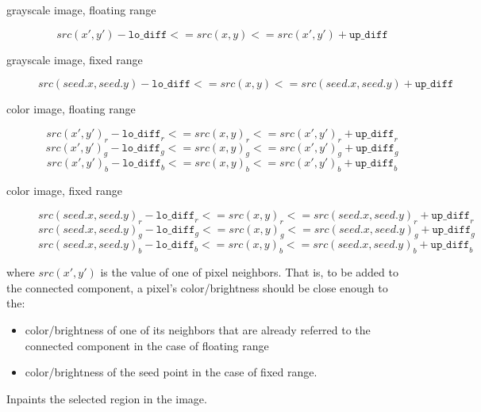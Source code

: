 \begin{description}

\item[grayscale image, floating range] \[
src(x',y')-\texttt{lo\_diff} <= src(x,y) <= src(x',y')+\texttt{up\_diff} \]

\item[grayscale image, fixed range] \[
src(seed.x,seed.y)-\texttt{lo\_diff}<=src(x,y)<=src(seed.x,seed.y)+\texttt{up\_diff} \]

\item[color image, floating range]
\[ src(x',y')_r-\texttt{lo\_diff}_r<=src(x,y)_r<=src(x',y')_r+\texttt{up\_diff}_r \]
\[ src(x',y')_g-\texttt{lo\_diff}_g<=src(x,y)_g<=src(x',y')_g+\texttt{up\_diff}_g \]
\[ src(x',y')_b-\texttt{lo\_diff}_b<=src(x,y)_b<=src(x',y')_b+\texttt{up\_diff}_b \]

\item[color image, fixed range]
\[ src(seed.x,seed.y)_r-\texttt{lo\_diff}_r<=src(x,y)_r<=src(seed.x,seed.y)_r+\texttt{up\_diff}_r \]
\[ src(seed.x,seed.y)_g-\texttt{lo\_diff}_g<=src(x,y)_g<=src(seed.x,seed.y)_g+\texttt{up\_diff}_g \]
\[ src(seed.x,seed.y)_b-\texttt{lo\_diff}_b<=src(x,y)_b<=src(seed.x,seed.y)_b+\texttt{up\_diff}_b \]
\end{description}

where $src(x',y')$ is the value of one of pixel neighbors. That is, to be added to the connected component, a pixel's color/brightness should be close enough to the:
\begin{itemize}
  \item color/brightness of one of its neighbors that are already referred to the connected component in the case of floating range
  \item color/brightness of the seed point in the case of fixed range.
\end{itemize}

Inpaints the selected region in the image.


